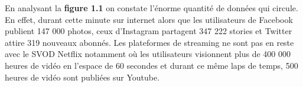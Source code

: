En analysant la \textbf{figure 1.1} on constate l'énorme quantité de données qui circule.  En effet, durant cette minute sur internet alors que les utilisateurs de Facebook publient 147 000 photos, ceux d'Instagram partagent 347 222 stories et Twitter attire 319 nouveaux abonnés. Les plateformes de streaming ne sont pas en reste avec le SVOD Netflix notamment où les utilisateurs visionnent plus de 400 000 heures de vidéo en l'espace de 60 secondes et durant ce même laps de temps, 500 heures de vidéo sont publiées sur Youtube.
